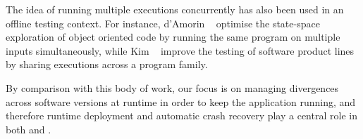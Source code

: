 The idea of running multiple executions concurrently has also been used in an
offline testing context.  For instance, d'Amorin \etal~\cite{delta-exec-oop}
optimise the state-space exploration of object oriented code by running the
same program on multiple inputs simultaneously, while Kim
\etal~\cite{shared-exec12} improve the testing of software product lines by
sharing executions across a program family.

By comparison with this body of work, our focus is on managing
divergences across software versions at runtime in order to keep the
application running, and therefore runtime deployment and automatic
crash recovery play a central role in both \mx and \varan.
